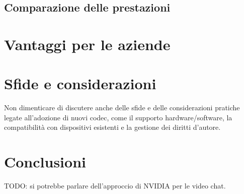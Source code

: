 \documentclass[a4paper,12pt, oneside]{article}
\begin{document}
\subsection{Comparazione delle prestazioni}

\section{Vantaggi per le aziende}

\section{Sfide e considerazioni}
Non dimenticare di discutere anche delle sfide e delle considerazioni pratiche legate all'adozione di nuovi codec, come il supporto hardware/software, la compatibilità con dispositivi esistenti e la gestione dei diritti d'autore.

\section{Conclusioni}
TODO: si potrebbe parlare dell'approccio di NVIDIA per le video chat.
\end{document}
